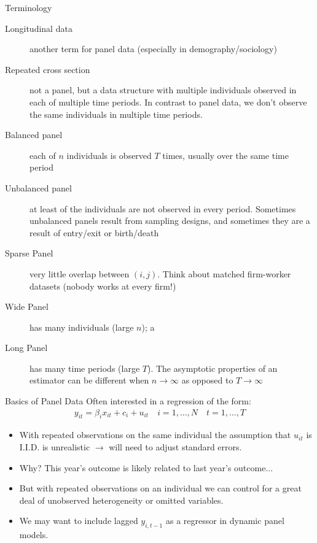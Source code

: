 \documentclass[aspectratio=169]{beamer}
\begin{document}
\begin{frame}{Terminology}
\begin{description}
\item[Longitudinal data] another term for panel data (especially in demography/sociology)
\item[Repeated cross section] not a panel, but a data structure with multiple
individuals observed in each of multiple time periods. In contrast to panel data,
we don't observe the same individuals in multiple time periods. 
\item[Balanced panel] each of $n$ individuals is observed $T$ times, usually
    over the same time period
\item[Unbalanced panel] at least of the individuals are not observed in every period.
    Sometimes unbalanced panels result from sampling designs, and sometimes they
    are a result of entry/exit or birth/death
\item[Sparse Panel] very little overlap between $(i,j)$. Think about matched firm-worker datasets (nobody works at every firm!)
\item[Wide Panel]has many individuals (large $n$); a
\item[Long Panel] has many time periods (large $T$). The asymptotic properties of an estimator can be different
 when $n \rightarrow \infty$ as opposed to $T \rightarrow \infty$
\end{description}
\end{frame}




\begin{frame}{Basics of Panel Data}
Often interested in a regression of the form:
\begin{align*}
y_{it} = \beta_i x_{it} + c_i + u_{it} \quad i=1,\ldots,N \quad t=1,\ldots,T
\end{align*}
\begin{itemize}
\item With \alert{repeated observations} on the same individual the assumption that $u_{it}$ is I.I.D. is unrealistic $\rightarrow$ will need to adjust standard errors.
\item Why? This year's outcome is likely related to last year's outcome...
\item But with repeated observations on an individual we can control for a great deal of \alert{unobserved heterogeneity} or omitted variables.
\item We may want to include lagged $y_{i,t-1}$ as a regressor in \alert{dynamic panel} models.
\end{itemize}
\end{frame}
\end{document}
